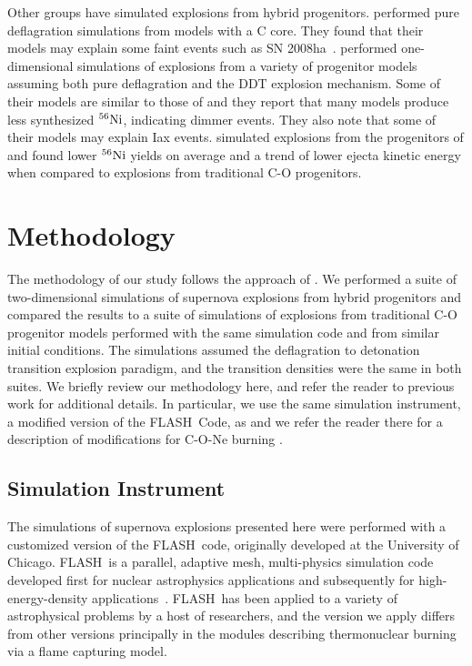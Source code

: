 \documentclass[iop,apj]{emulateapj}
\newcommand{\MarginPar}[1]{\marginpar{\vskip-\baselineskip\raggedright\tiny\sffamily\hrule\smallskip{\color{red}#1}\par\smallskip\hrule}}
\newcommand{\Ni}[1]{\ensuremath{{}^{#1}{\rm Ni}}}
\newcommand{\code}[1]{\textsc{#1}}
\newcommand{\FLASH}{\code{FLASH}}
\newcommand\blust{\bgroup\markoverwith{\textcolor{blue}{\rule[0.5ex]{2pt}{0.4pt}}}\ULon}
\begin{document}
Other groups have simulated explosions from hybrid progenitors.
\citet{kromeretal2015} performed pure deflagration simulations from models
with a C core. They found that their models may explain some faint events
such as SN 2008ha~\citep{foleyetal2009}.
\citet{bravoetal2016} performed one-dimensional simulations of explosions from
a variety of progenitor models assuming both pure deflagration and the DDT
explosion mechanism.
Some of their models are similar to those of \citep{denissenkovetal2015} and
they report that many models produce less synthesized
\Ni{56}, indicating dimmer events. They also note that some of their
models may explain Iax events.
\citet{willcoxetal2016} simulated explosions from the progenitors of
\citet{denissenkovetal2015} and found lower
\Ni{56} yields on average and a trend of lower ejecta kinetic energy
when compared to explosions from traditional C-O progenitors.


\section{Methodology}
\label{sec:method}

The methodology of our study follows the approach of \citet{willcoxetal2016}.
We performed a suite of two-dimensional simulations of supernova explosions
from hybrid progenitors and compared the results to a suite of simulations
of explosions from traditional C-O progenitor models performed with the
same simulation code and from similar initial conditions. The simulations assumed
the deflagration to detonation transition explosion paradigm, and the
transition densities were the same in both suites. We briefly review our methodology
here, and refer the reader to previous work for additional details.
In particular, we use the same simulation instrument, a modified version
of the \FLASH\ Code, as \citet{willcoxetal2016} and we refer the reader there
for a description of modifications for C-O-Ne burning \blust{and verification tests
of the burning module}. \MarginPar{See below}

\subsection{Simulation Instrument}

The simulations of supernova explosions presented here were performed
with a customized version of the \FLASH\ code, originally developed
at the University of Chicago.
\FLASH\ is a parallel, adaptive mesh, multi-physics simulation code
developed first for nuclear astrophysics applications and subsequently
for high-energy-density applications~\citep{Fryxetal00,calder.curtis.ea:high-performance,
calder.fryxell.ea:on,flash_pragmatic,flash_evolution}.
\FLASH\ has been applied to a variety of astrophysical problems by a host
of researchers, and the version we apply differs from other versions
principally in the modules describing thermonuclear burning via a
flame capturing model.
\end{document}
